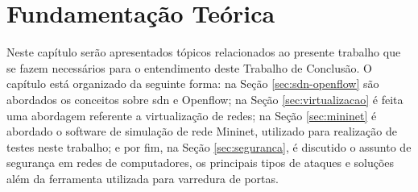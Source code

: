 \chapter{Fundamentação Teórica}
\label{cap:fundamentacao}

Neste capítulo serão apresentados tópicos relacionados ao presente trabalho que se fazem necessários para o entendimento deste Trabalho de Conclusão. O capítulo está organizado da seguinte forma: na Seção \ref{sec:sdn-openflow} são abordados os conceitos sobre \gls{sdn} e Openflow; na Seção \ref{sec:virtualizacao} é feita uma abordagem referente a virtualização de redes; na Seção \ref{sec:mininet} é abordado o software de simulação de rede Mininet, utilizado para realização de testes neste trabalho; e por fim, na Seção \ref{sec:seguranca}, é discutido o assunto de segurança em redes de computadores, os principais tipos de ataques e soluções além da ferramenta utilizada para varredura de portas.







